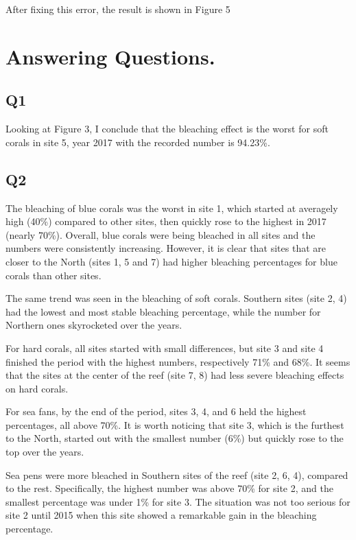 \documentclass[a4paper,12pt,twoside]{article}
\begin{document}
After fixing this error, the result is shown in Figure 5


\section{Answering Questions.}
\subsection*{Q1}
Looking at Figure 3, I conclude that the bleaching effect is the worst for soft corals in site 5, year 2017 with the recorded number is 94.23\%.
\subsection*{Q2}
The bleaching of blue corals was the worst in site 1, which started at averagely high (40\%) compared to other sites, then quickly rose to the highest in 2017 (nearly 70\%). Overall, blue corals were being bleached in all sites and the numbers were consistently increasing. However, it is clear that sites that are closer to the North (sites 1, 5 and 7) had higher bleaching percentages for blue corals than other sites.

The same trend was seen in the bleaching of soft corals. Southern sites (site 2, 4) had the lowest and most stable bleaching percentage, while the number for Northern ones skyrocketed over the years.

For hard corals, all sites started with small differences, but site 3 and site 4 finished the period with the highest numbers, respectively 71\% and 68\%. It seems that the sites at the center of the reef (site 7, 8) had less severe bleaching effects on hard corals.

For sea fans, by the end of the period, sites 3, 4, and 6  held the highest percentages, all above 70\%. It is worth noticing that site 3, which is the furthest to the North, started out with the smallest number (6\%) but quickly rose to the top over the years.

Sea pens were more bleached in Southern sites of the reef (site 2, 6, 4), compared to the rest. Specifically, the highest number was above 70\% for site 2, and the smallest percentage was under 1\% for site 3. The situation was not too serious for site 2 until 2015 when this site showed a remarkable gain in the bleaching percentage.
\end{document}
